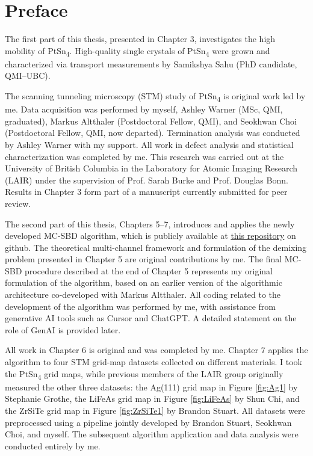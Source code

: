 
\chapter{Preface}
The first part of this thesis, presented in Chapter 3, investigates the high mobility of PtSn\textsubscript{4}. High-quality single crystals of PtSn\textsubscript{4} were grown and characterized via transport measurements by Samikshya Sahu (PhD candidate, QMI–UBC). 

The scanning tunneling microscopy (STM) study of PtSn\textsubscript{4} is original work led by me. Data acquisition was performed by myself, Ashley Warner (MSc, QMI, graduated), Markus Altthaler (Postdoctoral Fellow, QMI), and Seokhwan Choi (Postdoctoral Fellow, QMI, now departed). Termination analysis was conducted by Ashley Warner with my support. All work in defect analysis and statistical characterization was completed by me. This research was carried out at the University of British Columbia in the Laboratory for Atomic Imaging Research (LAIR) under the supervision of Prof. Sarah Burke and Prof. Douglas Bonn. Results in Chapter 3 form part of a manuscript currently submitted for peer review.

The second part of this thesis, Chapters 5–7, introduces and applies the newly developed \ac{MC-SBD} algorithm, which is publicly available at  \href{https://github.com/Plswearpants/MT-SBD-STM}{this repository} on github. The theoretical multi-channel framework and formulation of the demixing problem presented in Chapter 5 are original contributions by me. The final \ac{MC-SBD} procedure described at the end of Chapter 5 represents my original formulation of the algorithm, based on an earlier version of the algorithmic architecture co-developed with Markus Altthaler. All coding related to the development of the algorithm was performed by me, with assistance from generative AI tools such as Cursor and ChatGPT. A detailed statement on the role of GenAI is provided later.

All work in Chapter 6 is original and was completed by me. Chapter 7 applies the algorithm to four STM grid-map datasets collected on different materials. I took the PtSn\textsubscript{4} grid maps, while previous members of the LAIR group originally measured the other three datasets: the Ag(111) grid map in Figure \ref{fig:Ag1} by Stephanie Grothe, the LiFeAs grid map in Figure \ref{fig:LiFeAs} by Shun Chi, and the ZrSiTe grid map in Figure \ref{fig:ZrSiTe1} by Brandon Stuart. All datasets were preprocessed using a pipeline jointly developed by Brandon Stuart, Seokhwan Choi, and myself. The subsequent algorithm application and data analysis were conducted entirely by me.

